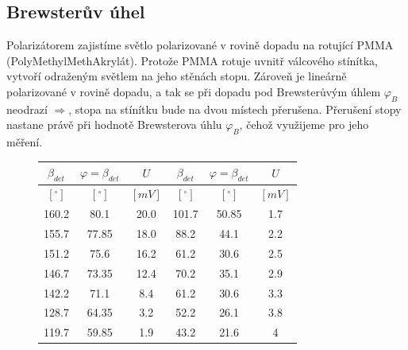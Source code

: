 \documentclass{article}
\begin{document}
\newpage
\subsection*{Brewsterův úhel}
Polarizátorem zajistíme světlo polarizované v rovině dopadu na rotující PMMA (PolyMethylMethAkrylát).
Protože PMMA rotuje uvnitř válcového stínítka, vytvoří odraženým světlem na jeho stěnách stopu.
Zároveň je lineárně polarizované v rovině dopadu, a tak se při dopadu pod Brewsterůvým úhlem \(\varphi_B\) neodrazí \(\Rightarrow\), stopa na stínítku bude na dvou místech přerušena.
Přerušení stopy nastane právě při hodnotě Brewsterova úhlu \(\varphi_B\), čehož využijeme pro jeho měření.

\begin{figure}[H]
	\begin{minipage}[t]{0.45\textwidth}
        \vspace{-85mm}
        \begin{tabular}{|c|c|c||c|c|c|}
            \hline
            \(\beta_{det}\)   & \(\varphi = \beta_{det}\)   & \(U\)     & \(\beta_{det}\)   & \(\varphi = \beta_{det}\)   & \(U\)       \\ \hline
            \([^\circ]\)      & \([^\circ]\)                & \([mV]\)  & \([^\circ]\)      & \([^\circ]\)                & \([mV]\)    \\ \hline
            160.2             & 80.1                        & 20.0      & 101.7             & 50.85                       & 1.7         \\ \hline
            155.7             & 77.85                       & 18.0      & 88.2              & 44.1                        & 2.2         \\ \hline
            151.2             & 75.6                        & 16.2      & 61.2              & 30.6                        & 2.5         \\ \hline
            146.7             & 73.35                       & 12.4      & 70.2              & 35.1                        & 2.9         \\ \hline
            142.2             & 71.1                        & 8.4       & 61.2              & 30.6                        & 3.3         \\ \hline
            128.7             & 64.35                       & 3.2       & 52.2              & 26.1                        & 3.8         \\ \hline
            119.7             & 59.85                       & 1.9       & 43.2              & 21.6                        & 4           \\ \hline

\end{tabular}
\end{minipage}
\end{figure}
\end{document}
